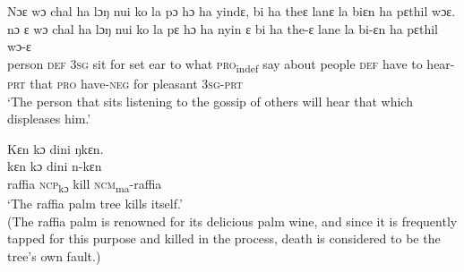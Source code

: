 \ea%
\label{ex:255}
Nɔɛ wɔ chal ha lɔŋ nui ko la pɔ hɔ ha yindɛ, bi ha theɛ lanɛ la biɛn ha pɛthil wɔɛ.\\
\gll nɔ ɛ    wɔ    chal  ha    lɔŋ  nui  ko    la    pɛ      hɔ    ha      nyin ɛ bi    ha    the-ɛ      lane  la    bi-ɛn      ha    pɛthil    wɔ-ɛ\\
person  \textsc{def}  \textsc{3sg}  sit    for    set    ear  to    what  \textsc{pro}\textsubscript{indef}  say  about    people  \textsc{def} have  to    hear-\textsc{prt}    that  \textsc{pro}  have-\textsc{neg}  for    pleasant  \textsc{3sg-prt}\\
\glt ‘The person that sits listening to the gossip of others will hear that which displeases him.'
\z

\ea%
\label{ex:256}
Kɛn kɔ dini ŋkɛn.\\
\gll kɛn  kɔ      dini  n-kɛn\\
raffia  \textsc{ncp}\textsubscript{kɔ}    kill  \textsc{ncm}\textsubscript{ma}{}-raffia\\
\glt ‘The raffia palm tree kills itself.'\\
(The raffia palm is renowned for its delicious palm wine, and since it is frequently tapped for this purpose and killed in the process, death is considered to be the tree's own fault.)
\z




